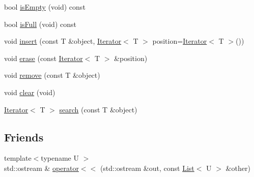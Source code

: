 \begin{DoxyCompactItemize}
\item 
bool \hyperlink{classcrap_1_1container_1_1_list_aa6fd5c6d2ae6e19efc1dfd922ae27dac}{is\-Empty} (void) const 
\item 
bool \hyperlink{classcrap_1_1container_1_1_list_a075cfb60ae229966bafb6b83cca701a4}{is\-Full} (void) const 
\item 
void \hyperlink{classcrap_1_1container_1_1_list_adbfe539bd526d187cc9f2b10e8b8a3ce}{insert} (const T \&object, \hyperlink{class_iterator}{Iterator}$<$ T $>$ position=\hyperlink{class_iterator}{Iterator}$<$ T $>$())
\item 
void \hyperlink{classcrap_1_1container_1_1_list_a5417a992ef49c142d5293a8f857dda0a}{erase} (const \hyperlink{class_iterator}{Iterator}$<$ T $>$ \&position)
\item 
void \hyperlink{classcrap_1_1container_1_1_list_a7a0522b71bd4e6525add9b6c1beaaa84}{remove} (const T \&object)
\item 
void \hyperlink{classcrap_1_1container_1_1_list_a596359562e35d7844d11919058b81d9c}{clear} (void)
\item 
\hyperlink{class_iterator}{Iterator}$<$ T $>$ \hyperlink{classcrap_1_1container_1_1_list_a4d995a30125a96c5613658bf2d74d515}{search} (const T \&object)
\end{DoxyCompactItemize}
\subsection*{Friends}
\begin{DoxyCompactItemize}
\item 
{\footnotesize template$<$typename U $>$ }\\std\-::ostream \& \hyperlink{classcrap_1_1container_1_1_list_a7d087fa00b662c42e589d792946cc5a3}{operator$<$$<$} (std\-::ostream \&out, const \hyperlink{classcrap_1_1container_1_1_list}{List}$<$ U $>$ \&other)
\end{DoxyCompactItemize}


